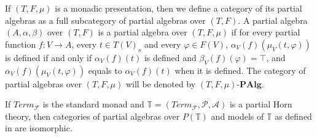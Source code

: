 \documentclass{elsarticle}
\theoremstyle{definition}
\theoremstyle{remark}
\newcommand{\cat}[1]{\mathbf{#1}}
\newcommand{\PAlg}[1]{#1\text{-}\cat{PAlg}}
\numberwithin{figure}{section}
\begin{document}
If $(T,F,\mu)$ is a monadic presentation, then we define a category of its partial algebras as a full subcategory of partial algebras over $(T,F)$.
A partial algebra $(A,\alpha,\beta)$ over $(T,F)$ is a partial algebra over $(T,F,\mu)$ if for every partial function $f : V \to A$,
    every $t \in T(V)_s$ and every $\varphi \in F(V)$, $\alpha_V(f)(\mu_V(t,\varphi))$ is defined if and only if $\alpha_V(f)(t)$ is defined and $\beta_V(f)(\varphi) = \top$,
    and $\alpha_V(f)(\mu_V(t,\varphi))$ equals to $\alpha_V(f)(t)$ when it is defined.
The category of partial algebras over $(T,F,\mu)$ will be denoted by $\PAlg{(T,F,\mu)}$.

\begin{lem}
If $Term_\mathcal{F}$ is the standard monad and $\mathbb{T} = (Term_\mathcal{F},\mathcal{P},\mathcal{A})$ is a partial Horn theory,
    then categories of partial algebras over $P(\mathbb{T})$ and models of $\mathbb{T}$ as defined in \cite{PHL} are isomorphic.
\end{lem}
\end{document}
